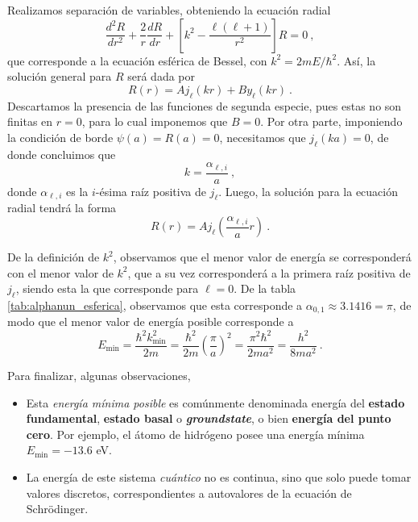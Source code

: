 \begin{ejemplo}
    Realizamos separación de variables, obteniendo la ecuación radial
    \begin{equation*}
        \frac{d^2R}{dr^2} + \frac{2}{r} \frac{dR}{dr} + \left[ k^2 - \frac{\ell(\ell+1)}{r^2} \right]R = 0 \ ,
    \end{equation*}
    que corresponde a la ecuación esférica de Bessel, con $k^2 = 2mE/\hbar^2$. Así, la solución general para $R$ será dada por
    \begin{equation*}
        R(r) = A j_\ell(kr) + By_\ell(kr) \ .
    \end{equation*}
    Descartamos la presencia de las funciones de segunda especie, pues estas no son finitas en $r = 0$, para lo cual imponemos que $B = 0$. Por otra parte, imponiendo la condición de borde $\psi(a) = R(a) = 0$, necesitamos que $j_\ell(ka) = 0$, de donde concluimos que
    \begin{equation*}
        k = \frac{\alpha_{\ell,i}}{a} \ ,
    \end{equation*}
    donde $\alpha_{\ell,i}$ es la $i$-ésima raíz positiva de $j_\ell$. Luego, la solución para la ecuación radial tendrá la forma
    \begin{equation*}
        R(r) = A j_\ell \left( \frac{\alpha_{\ell,i}}{a} r \right) \ .
    \end{equation*}

    De la definición de $k^2$, observamos que el menor valor de energía se corresponderá con el menor valor de $k^2$, que a su vez corresponderá a la primera raíz positiva de $j_\ell$, siendo esta la que corresponde para $\ell = 0$. De la tabla \ref{tab:alphanun_esferica}, observamos que esta corresponde a $\alpha_{0,1} \approx 3.1416 = \pi$, de modo que el menor valor de energía posible corresponde a
    \begin{equation*}
        E_{\min} = \frac{\hbar^2 k_{\min}^2}{2m} = \frac{\hbar^2}{2m} \left(\frac{\pi}{a}\right)^2 = \frac{\pi^2 \hbar^2}{2ma^2} = \frac{h^2}{8ma^2} \ .
    \end{equation*}

    Para finalizar, algunas observaciones,
    \begin{itemize}
        \item Esta \emph{energía mínima posible} es comúnmente denominada energía del \textbf{estado fundamental}, \textbf{estado basal} o \textbf{\emph{groundstate}}, o bien \textbf{energía del punto cero}. Por ejemplo, el átomo de hidrógeno posee una energía mínima $E_{\min} = -13.6$ eV.
        
        \item La energía de este sistema \emph{cuántico} no es continua, sino que solo puede tomar valores discretos, correspondientes a autovalores de la ecuación de Schrödinger.
        

\end{itemize}
\end{ejemplo}
